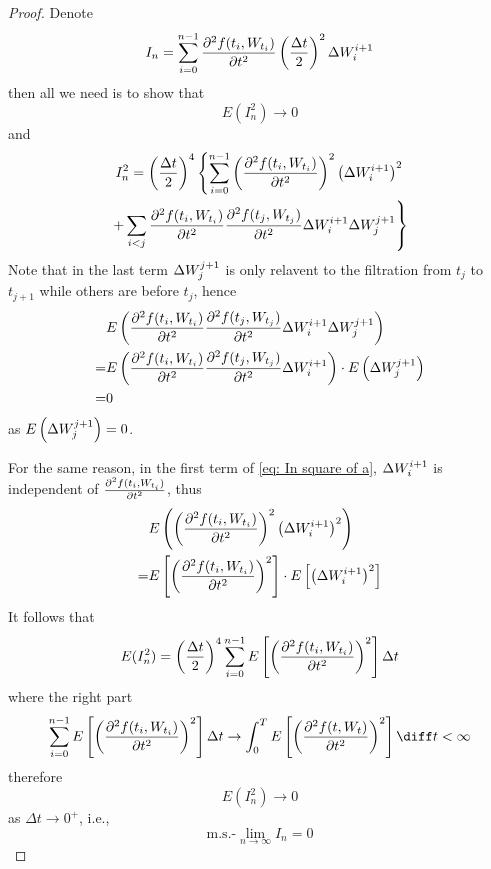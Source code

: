     \begin{subproblem}[(\alph*)]
        \item
        \begin{proof}
            Denote
            \[I_n=\sum_{i=0}^{n-1}\frac{\partial^2f(t_{i},W_{t_{i}})}{\partial t^2}\left(\frac{\Delta t}{2}\right)^2
            \Delta W_{i}^{i+1}\]
            then all we need is to show that
            \[E(I_n^2)\to 0\]
            and
            \begin{multline}
                \label{eq: In square of a}
                I_n^2=
                \left(\frac{\Delta t}{2}\right)^4
                \left\{
                \sum_{i=0}^{n-1}\left(\frac{\partial^2f(t_{i},W_{t_{i}})}{\partial t^2}\right)^2
                \left(\Delta W_{i}^{i+1}\right)^2\right.\\
                \left.+\sum_{i<j}\frac{\partial^2f(t_{i},W_{t_{i}})}{\partial t^2}\frac{\partial^2f(t_{j},W_{t_{j}})}{\partial t^2}\Delta W_{i}^{i+1}\Delta W_{j}^{j+1}
                \right\}
            \end{multline}
            Note that in the last term $\Delta W_{j}^{j+1}$ is only relavent
            to the filtration from $t_j$ to $t_{j+1}$ while
            others are before $t_j$, hence
            \[\begin{aligned}
             &E\left(\frac{\partial^2f(t_{i},W_{t_{i}})}{\partial t^2}\frac{\partial^2f(t_{j},W_{t_{j}})}{\partial t^2}\Delta W_{i}^{i+1}\Delta W_{j}^{j+1}\right)\\
            =&E\left(\frac{\partial^2f(t_{i},W_{t_{i}})}{\partial t^2}\frac{\partial^2f(t_{j},W_{t_{j}})}{\partial t^2}\Delta W_{i}^{i+1}\right)\cdot
            E\left(\Delta W_{j}^{j+1}\right)\\
            =&0\\
            \end{aligned}\]
            as $E\left(\Delta W_{j}^{j+1}\right)=0$.

            For the same reason, in the first term of \cref{eq: In square of a},
            $\Delta W_{i}^{i+1}$ is independent of $\frac{\partial^2f(t_{i},W_{t_{i}})}{\partial t^2}$, thus
            \[\begin{aligned}
                &E\left(\left(\frac{\partial^2f(t_{i},W_{t_{i}})}{\partial t^2}\right)^2\left(\Delta W_{i}^{i+1}\right)^2\right)\\
                =&E\left[\left(\frac{\partial^2f(t_{i},W_{t_{i}})}{\partial t^2}\right)^2\right]
                 \cdot E\left[\left(\Delta W_{i}^{i+1}\right)^2\right]\\
            \end{aligned}\]
            \newcommand{\integrand}[1][]{%
                \if\relax\detokenize{#1}\relax
                E\left[
                \left(\frac{\partial^2f(t,W_t)}{\partial t^2}\right)^2
                \right]
                \else
                E\left[\left(\ptt #1\right)^2\right]
                \fi
            }
            It follows that
            \[E(I_n^2)=
            \left(\frac{\Delta t}{2}\right)^4
            \sum_{i=0}^{n-1}
            \integrand[i]\Delta t
            \]
            where the right part
            \[\sum_{i=0}^{n-1}\integrand[i]\Delta t
            \to\int_0^T\integrand\diff t<\infty\]
            therefore
            \[E(I_n^2)\to 0\]
            as $\Delta t\to 0^+$, i.e.,
            \[\text{m.s.-}\lim_{n\to\infty}I_n=0\]
        

\end{proof}
\end{subproblem}
